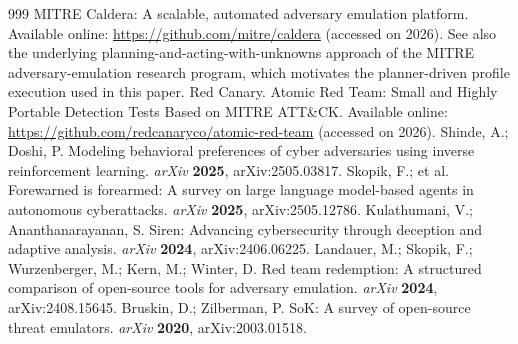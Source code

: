 \documentclass[preprints,article,accept,oneauthor]{Definitions/mdpi}
\begin{document}
{\begin{thebibliography}{999}
MITRE Caldera: A scalable, automated adversary emulation platform. Available
online: \url{https://github.com/mitre/caldera} (accessed on 2026). See also
the underlying planning-and-acting-with-unknowns approach of the MITRE
adversary-emulation research program, which motivates the planner-driven
profile execution used in this paper.
Red Canary. Atomic Red Team: Small and Highly Portable Detection Tests
Based on MITRE ATT\&CK. Available online:
\url{https://github.com/redcanaryco/atomic-red-team} (accessed on 2026).
Shinde, A.; Doshi, P. Modeling behavioral preferences of cyber adversaries
using inverse reinforcement learning. {\em arXiv} {\bf 2025},
arXiv:2505.03817.
Skopik, F.; et al. Forewarned is forearmed: A survey on large language
model-based agents in autonomous cyberattacks. {\em arXiv} {\bf 2025},
arXiv:2505.12786.
Kulathumani, V.; Ananthanarayanan, S. Siren: Advancing cybersecurity
through deception and adaptive analysis. {\em arXiv} {\bf 2024},
arXiv:2406.06225.
Landauer, M.; Skopik, F.; Wurzenberger, M.; Kern, M.; Winter, D.
Red team redemption: A structured comparison of open-source tools for
adversary emulation. {\em arXiv} {\bf 2024}, arXiv:2408.15645.
Bruskin, D.; Zilberman, P. SoK: A survey of open-source threat emulators.
{\em arXiv} {\bf 2020}, arXiv:2003.01518.
\end{thebibliography}
}

\PublishersNote{}
\end{document}
